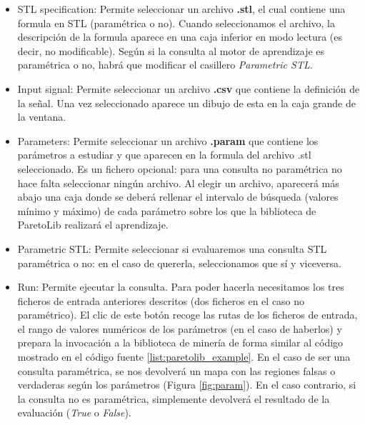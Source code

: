 \begin{itemize}
\item STL specification: Permite seleccionar un archivo \textbf{.stl}, el cual contiene una formula en STL (paramétrica o no). Cuando seleccionamos el archivo, la descripción de la formula aparece en una caja inferior en modo lectura (es decir, no modificable). Según si la consulta al motor de aprendizaje es paramétrica o no, habrá que modificar el casillero \textit{Parametric STL}.

\item Input signal: Permite seleccionar un archivo \textbf{.csv} que contiene la definición de la señal. Una vez seleccionado aparece un dibujo de esta en la caja grande de la ventana.

\item Parameters: Permite seleccionar un archivo \textbf{.param} que contiene los parámetros a estudiar y que aparecen en la formula del archivo .stl seleccionado. Es un fichero opcional: para una consulta no paramétrica no hace falta seleccionar ningún archivo. Al elegir un archivo, aparecerá más abajo una caja donde se deberá rellenar el intervalo de búsqueda (valores mínimo y máximo) de cada parámetro sobre los que la biblioteca de ParetoLib realizará el aprendizaje. 

\item Parametric STL: Permite seleccionar si evaluaremos una consulta STL paramétrica o no: en el caso de quererla, seleccionamos que sí y viceversa.

\item Run: Permite ejecutar la consulta. Para poder hacerla necesitamos los tres ficheros de entrada anteriores descritos (dos ficheros en el caso no paramétrico). El clic de este botón recoge las rutas de los ficheros de entrada, el rango de valores numéricos de los parámetros (en el caso de haberlos) y prepara la invocación a la biblioteca de minería de forma similar al código mostrado en el código fuente \ref{list:paretolib_example}. En el caso de ser una consulta paramétrica, se nos devolverá un mapa con las regiones falsas o verdaderas según los parámetros (Figura \ref{fig:param}). En el caso contrario, si la consulta no es paramétrica, simplemente devolverá el resultado de la evaluación (\textit{True} o \textit{False}).
\end{itemize}
